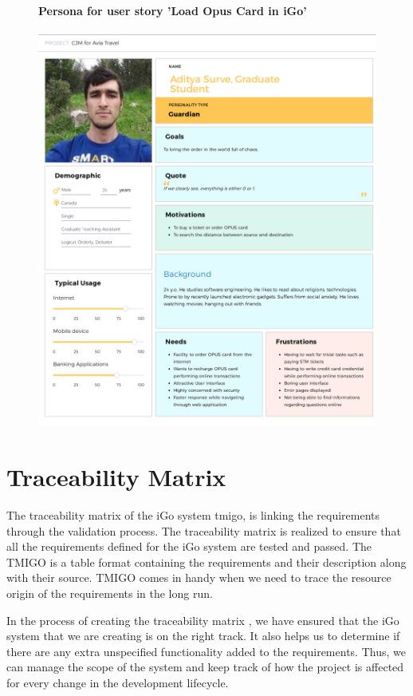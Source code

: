 \documentclass[11pt, english]{report}
\begin{document}
\begin{figure}[H]
\textbf{Persona for user story 'Load Opus Card in iGo'}
\\\\
  \includegraphics[width=1\textwidth]{images/Aditya Surve.png}
  \centering
\end{figure}

\chapter{Traceability Matrix }

The traceability matrix\cite{trace} of the iGo system \gls{tmigo}, is linking the requirements through the validation process. The traceability matrix is realized to ensure that all the requirements defined for the iGo system are tested and passed. The TMIGO is a table format containing the requirements and their description along with their source. TMIGO comes in handy when we need to trace the resource origin of the requirements in the long run. 

In the process of creating the traceability matrix , we have ensured that the iGo system that we are creating is on the right track. It also helps us to determine if there are any extra unspecified functionality added to the requirements. Thus, we can manage the scope of the system and keep track of how the project is affected for every change in the development lifecycle. 
\end{document}
